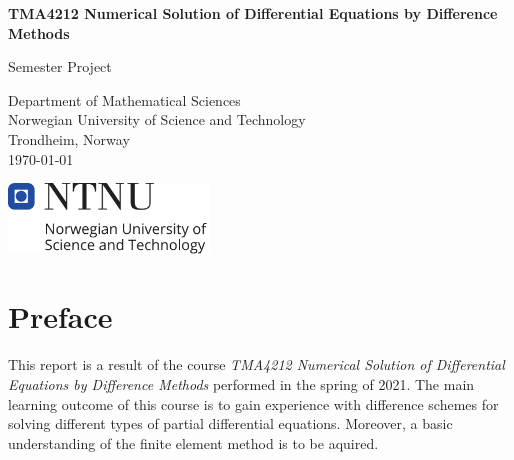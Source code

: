 \documentclass[a4paper, 12pt]{book}
\theoremstyle{break}
\theoremstyle{plain}
\begin{document}
\nocite{*}

\begin{titlepage}
    \begin{center}
        \vspace*{1cm}
            
        \Huge
        \textbf{TMA4212 Numerical Solution of Differential Equations by Difference Methods}
            
        \vspace{1cm}
        \LARGE
        Semester Project
            
        \vspace{1.5cm}
            
            
        \vfill
        
        \Large
        Department of Mathematical Sciences\\
        Norwegian University of Science and Technology\\
        Trondheim, Norway\\
        \today \\
        
        \vfill 
        
        \includegraphics[width=0.4\textwidth]{ntnu_hoeyde_eng.pdf}
        
            
    \end{center}
\end{titlepage}


\chapter*{Preface}
This report is a result of the course \textit{TMA4212 Numerical Solution of Differential Equations by Difference Methods} performed in the spring of 2021. The main learning outcome of this course is to gain experience with difference schemes for solving different types of partial differential equations. Moreover, a basic understanding of the finite element method is to be aquired. \newline
\end{document}
